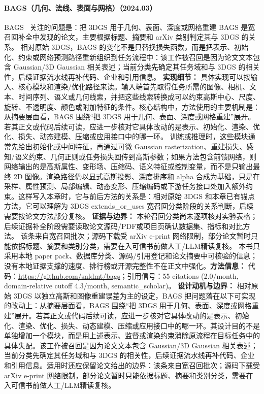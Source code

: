 \paragraph{BAGS（几何、法线、表面与网格）（2024.03）}
BAGS~\cite{2403_04926} 关注的问题是：把 3DGS 用于几何、表面、深度或网格重建 BAGS 是宽召回补全中发现的论文，主要根据标题、摘要和 arXiv 类别判定其与 3DGS 的关系。
相对原始 3DGS，BAGS 的变化不是只替换损失函数，而是把表示、初始化、约束或网络预测路径重新组织到任务流程中：该工作被召回是因为论文文本包含 Gaussian/3D Gaussian 相关表述；当前分类先确定其任务域和与 3DGS 的相关性，后续证据流水线再补代码、企业和引用信息。
\textbf{实现细节：} 具体实现可以按输入、核心模块和渲染/优化路径来读。输入端首先取得任务所需的图像、相机、文本、时间序列、语义或几何线索，并把这些线索转换成可以约束高斯中心、尺度、旋转、不透明度、颜色或附加特征的条件。核心结构中，方法使用的主要机制是：从摘要层面看，BAGS 围绕“把 3DGS 用于几何、表面、深度或网格重建”展开。若其正文或代码后续可读，应进一步核对它具体改动的是表示、初始化、渲染、优化、损失、动态建模、压缩或应用接口中的哪一环。 训练或推理时，这些模块通常先给出初始化或中间特征，再通过可微 Gaussian rasterization、重建损失、感知/语义约束、几何正则或任务损失回传到高斯参数；如果方法包含前馈网络，则网络输出的是高斯属性、变形场、压缩码、语义特征或控制变量，而不是只输出最终 2D 图像。渲染路径仍以显式高斯投影、深度排序和 alpha 合成为基础，只是在采样、属性预测、局部编辑、动态变形、压缩编码或下游任务接口处加入额外约束。这样写入本章时，它与前后方法的关系是：相对原始 3DGS 和本章已有锚点方法，它可以理解为 3DGS extends\_or\_uses 宽召回分类阶段的关系判断，后续需要按论文方法部分复核。
\textbf{证据与边界：} 本轮召回分类尚未逐项核对实验表格；后续证据补全阶段需要读取论文源码/PDF或项目页确认数据集、指标和对比方法。 该条来自宽召回批次；源码下载受 arXiv e-print 网络限制，部分论文暂时只能依据标题、摘要和类别分类，需要在入可信书前做人工/LLM精读复核。 本书只采用本地 paper pack、数据库分类、源码/引用登记和论文摘要中可核验的信息；没有本地证据支撑的速度、排行榜或开源完整性不在正文中强化。\textbf{方法信息：} 代码：\url{https://github.com/snldmt/bags}；引用信号：55 citations (2.0/month, domain-relative cutoff 4.3/month, semantic\_scholar)。
\textbf{设计动机与边界：} 相对原始 3DGS 以独立高斯和图像重建误差为主的设定，BAGS 把问题落在以下可实现的改动上：从摘要层面看，BAGS 围绕“把 3DGS 用于几何、表面、深度或网格重建”展开。若其正文或代码后续可读，应进一步核对它具体改动的是表示、初始化、渲染、优化、损失、动态建模、压缩或应用接口中的哪一环。其设计目的不是单独增加一个模块，而是用上述表示、监督或渲染约束消除原流程在目标任务中的具体失配。该工作被召回是因为论文文本包含 Gaussian/3D Gaussian 相关表述；当前分类先确定其任务域和与 3DGS 的相关性，后续证据流水线再补代码、企业和引用信息。适用时还应保留论文给出的边界：该条来自宽召回批次；源码下载受 arXiv e-print 网络限制，部分论文暂时只能依据标题、摘要和类别分类，需要在入可信书前做人工/LLM精读复核。
